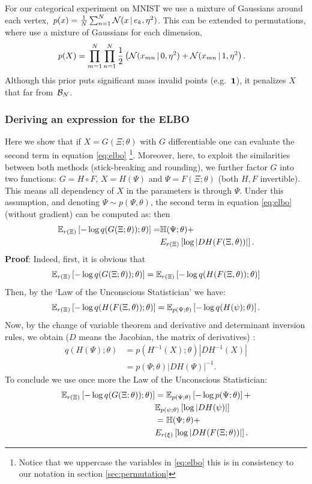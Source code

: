 \documentclass[twoside]{article}
\begin{document}
For our categorical experiment on MNIST we use a mixture of Gaussians around
each vertex,~${p(x) = \tfrac{1}{N} \sum_{n=1}^N \mathcal{N}(x \, | \, e_k, \eta^2)}$. 
This can be extended to permutations, where use a mixture of Gaussians for each
dimension,
\begin{align}
\label{eq:permprior}
  \nonumber p(X) &= \prod_{m=1}^N \prod_{n=1}^N
  \frac{1}{2} \left(\mathcal{N}(x_{mn} \, | \, 0, \eta^2) + \mathcal{N}(x_{mn} \, | \, 1, \eta^2 \right).
  \end{align}
Although this prior puts significant mass invalid points
(e.g.~$\boldsymbol{1}$), it penalizes $X$ that far from~$\mathcal{B}_N$.

\subsubsection*{Deriving an expression for the ELBO}
Here we show that if $X=G(\Xi;\theta)$ with $G$ differentiable one can evaluate the second term in equation \eqref{eq:elbo} \footnote{Notice that we uppercase the variables in \eqref{eq:elbo} this is in consistency to our notation in section \ref{sec:permutation}}. Moreover, here, to exploit the similarities between both methods (stick-breaking and rounding), we further factor $G$ into two functions: $G=H \circ F$, $X = H(\Psi)$ and $\Psi = F(\Xi; \theta)$ (both $H,F$ invertible). This means all dependency of $X$ in the parameters is through $\Psi$. Under this assumption, and denoting $\Psi\sim p(\Psi,\theta)$, the second term in equation \eqref{eq:elbo} (without gradient) can be computed as:
 then \begin{align} \nonumber
\mathbb{E}_{r(\Xi)} \left[- \log q(G(\Xi;\theta)); \theta) \right] = & \mathbb{H}(\Psi; \theta) +\\ \nonumber & E_{r(\Xi)}\left[\log | DH(F(\Xi,\theta))|\right].\end{align}
\textbf{Proof}:
Indeed, first, it is obvious that $$\mathbb{E}_{r(\Xi)} \left[- \log q(G(\Xi;\theta)); \theta) \right] = \mathbb{E}_{r(\Xi)} \left[- \log q(H(F(\Xi,\theta)); \theta) \right] $$
Then, by the `Law of the Unconscious Statistician' we have:
 $$\mathbb{E}_{r(\Xi)} \left[- \log q(H(F(\Xi,\theta)); \theta) \right] = \mathbb{E}_{p(\Psi;\theta)} \left[- \log q(H(\psi); \theta) \right]. $$
Now, by the change of variable theorem and derivative and determinant inversion rules, we obtain ($D$ means the Jacobian, the matrix of derivatives) :\begin{align}
\nonumber q(H(\Psi); \theta) & = p(H^{-1}(X) ;\theta)  |DH ^{-1}(X) | \\ \nonumber
 & = p(\Psi; \theta) | DH (\Psi) | ^{-1}.
 \end{align}
 To conclude we use once more the Law of the Unconscious Statistician:
 \begin{eqnarray}
\nonumber \mathbb{E}_{r(\Xi)} \left[- \log q(G(\Xi;\theta)); \theta) \right]  &= \mathbb{E}_{p(\Psi;\theta)}\left[ - \log p(\Psi;\theta)\right] +   \\ & \nonumber \mathbb{E}_{p(\psi;\theta)}\left[\log | DH(\psi)|\right] \\ \label{eq:elbo2} 
 &= \mathbb{H}(\Psi; \theta)+ \\ \nonumber & E_{r(\xi)}\left[\log | DH(F(\Xi;\theta))|\right].\end{eqnarray}
 
\end{document}
